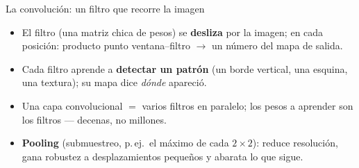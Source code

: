 \documentclass{beamer}
\newcommand{\1}{\mathbb{I}}
\begin{document}
\begin{frame}{La convolución: un filtro que recorre la imagen}
\small
\begin{center}
\end{center}
\pause

\begin{itemize}\itemsep4pt
  \item El filtro (una matriz chica de pesos) se \textbf{desliza} por la imagen; en cada posición: producto punto ventana--filtro $\rightarrow$ un número del mapa de salida.
  \item Cada filtro aprende a \textbf{detectar un patrón} (un borde vertical, una esquina, una textura); su mapa dice \emph{dónde} apareció.
  \item Una capa convolucional $=$ varios filtros en paralelo; los pesos a aprender son los filtros --- decenas, no millones. \pause
  \item \textbf{Pooling} (submuestreo, p.\,ej.\ el máximo de cada $2\times2$): reduce resolución, gana robustez a desplazamientos pequeños y abarata lo que sigue.
\end{itemize}
\end{frame}
\end{document}
